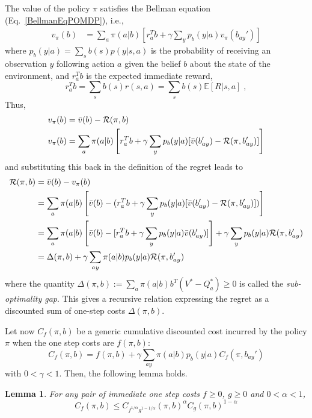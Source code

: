 \documentclass[aps,nofootinbib,groupaddress,superscriptaddress,reprint,amsmath,amssymb,graphicx,onecolumn,prx]{revtex4-2}
\newtheorem{lemma}[theorem]{Lemma}
\begin{document}
The value of the policy $\pi$ satisfies the Bellman equation (Eq.~\eqref{BellmanEqPOMDP}), i.e.,
\begin{align}
    v_\pi(b)&=\sum_{a}\pi(a|b)\left[r_a^Tb+\gamma \sum_y p_b(y|a)v_\pi(b_{ay}')\right]
\end{align}
where $p_b(y|a) = \sum_s b(s) p(y|s,a)$ is the probability of receiving an observation $y$ following action $a$ given the belief $b$ about the state of the environment, and $r_a^Tb$ is the expected immediate reward,
\begin{equation}
    r_a^Tb=\sum_s b(s)r(s,a)=\sum_s b(s)\mathbb{E}[R|s,a] \; ,
\end{equation} 
Thus,
\begin{align}
    v_\pi(b)&= \bar{v}(b)-\mathcal{R}(\pi,b) \notag \\
    v_\pi(b)&=\sum_a\pi(a|b)\left[ r_a^Tb+\gamma\sum_y p_b(y|a)[\bar{v}(b_{ay}')-\mathcal{R}(\pi,b_{ay}')]\right]
\end{align}
and substituting this back in the definition of the regret leads to
\begin{align}    
    \mathcal{R}(\pi,b)&=\bar{v}(b)-v_\pi(b) \notag \\
    &=\sum_a\pi(a|b)\left[\bar{v}(b)-(r_a^Tb+\gamma\sum_yp_b(y|a)[\bar{v}(b_{ay}')-\mathcal{R}(\pi,b_{ay}')])\right] \notag \\
    &=\sum_a \pi(a|b) \left[ \bar{v}(b)-[r_a^Tb+\gamma\sum_yp_b(y|a)\bar{v}(b_{ay}')]\right]+\gamma\sum_y p_b(y|a) \mathcal{R}(\pi,b_{ay}') \notag \\
    &=\Delta(\pi,b)+\gamma\sum_{ay}\pi(a|b)p_b(y|a)\mathcal{R}(\pi,b_{ay}')
\end{align}
where the quantity $\Delta(\pi,b):=\sum_a\pi(a|b)b^T(V^*-Q_a^*)\geq0$ is called the \textit{sub-optimality gap}. This gives a recursive relation expressing the regret as a discounted sum of one-step costs $\Delta(\pi,b)$. 

Let now $C_f(\pi,b)$ be a generic cumulative discounted cost incurred by the policy $\pi$ when the one step costs are $f(\pi,b)$:
\begin{equation}
    C_f(\pi,b)=f(\pi,b)+\gamma\sum_{ay}\pi(a|b)p_b(y|a)C_f(\pi,b_{ay}')
\end{equation}
with $0<\gamma<1$. Then, the following lemma holds.
\begin{lemma}
For any pair of immediate one step costs $f\geq0$, $g\geq0$ and $0<\alpha<1$,
\begin{equation}
    C_f(\pi,b)\leq C_{f^{1/\alpha}g^{1-1/\alpha}}(\pi,b)^\alpha C_g(\pi,b)^{1-\alpha}
\end{equation}
\end{lemma}
\end{document}
